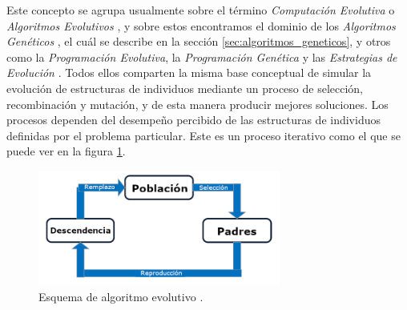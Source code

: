 Este concepto se agrupa usualmente sobre el término \emph{Computación Evolutiva} o \emph{Algoritmos Evolutivos} \cite{back1997handbook}\cite{back1996evolutionary}, y sobre estos encontramos el dominio de los \emph{Algoritmos Genéticos} \cite{holland1992adaptation}\cite{goldberg1989genetic}, el cuál se describe en la sección \ref{sec:algoritmos_geneticos}, y otros como la \emph{Programación Evolutiva}\cite{fogel1966artificial}, la \emph{Programación Genética} \cite{koza1992genetic}\cite{michalewicz1996genetic} y las \emph{Estrategias de Evolución} \cite{vent1975rechenberg}\cite{schwefel1977evolutionsstrategien}. Todos ellos comparten la misma base conceptual de simular la evolución de estructuras de individuos mediante un proceso de selección, recombinación y mutación, y de esta manera producir mejores soluciones. Los procesos dependen del desempeño percibido de las estructuras de individuos definidas por el problema particular. Este es un proceso iterativo como el que se puede ver en la figura \ref{fig:esquema_evolutivo}.
\begin{figure}[h]
	\centering
	\includegraphics[width=8cm]{imagenes/esquema_evolutivo.png}
	\caption{Esquema de algoritmo evolutivo \cite{grosan2011intelligent}.}
	\label{fig:esquema_evolutivo}
\end{figure}


